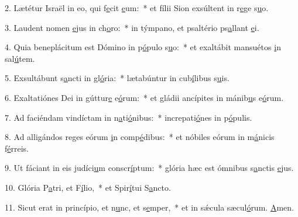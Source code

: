 2. Lætétur Israël in eo, qui f\uline{e}cit \uline{e}um:~* et fílii Sion exsúltent in r\uline{e}ge s\uline{u}o.\par 
3. Laudent nomen \uline{e}jus in ch\uline{o}ro:~* in týmpano, et psaltério ps\uline{a}llant \uline{e}i.\par 
4. Quia beneplácitum est Dómino in p\uline{ó}pulo s\uline{u}o:~* et exaltábit mansuétos \uline{i}n sal\uline{ú}tem.\par 
5. Exsultábunt s\uline{a}ncti in gl\uline{ó}ria:~* lætabúntur in cub\uline{í}libus s\uline{u}is.\par 
6. Exaltatiónes Dei in gúttur\uline{e} e\uline{ó}rum:~* et gládii ancípites in mánib\uline{u}s e\uline{ó}rum.\par 
7. Ad faciéndam vindíctam in n\uline{a}ti\uline{ó}nibus:~* increpati\uline{ó}nes in p\uline{ó}pulis.\par 
8. Ad alligándos reges eórum \uline{i}n comp\uline{é}dibus:~* et nóbiles eórum in m\uline{á}nicis f\uline{é}rreis.\par 
9. Ut fáciant in eis judíci\uline{u}m conscr\uline{í}ptum:~* glória hæc est ómnibus s\uline{a}nctis \uline{e}jus.\par 
10. Glória P\uline{a}tri, et F\uline{í}lio,~* et Spir\uline{í}tui S\uline{a}ncto.\par 
11. Sicut erat in princípio, et n\uline{u}nc, et s\uline{e}mper,~* et in sǽcula sæcul\uline{ó}rum. \uline{A}men.\par 
